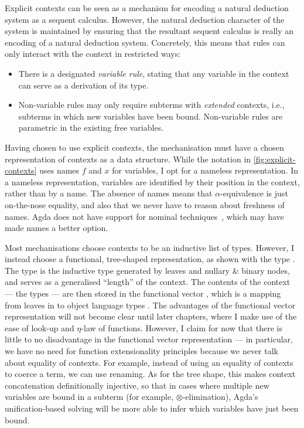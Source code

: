 Explicit contexts can be seen as a mechanism for encoding a natural deduction
system as a sequent calculus.
However, the natural deduction character of the system is maintained by
ensuring that the resultant sequent calculus is really an encoding of a
natural deduction system.
Concretely, this means that rules can only interact with the context in
restricted ways:

\begin{itemize}
  \item There is a designated \emph{variable rule}, stating that any variable
    in the context can serve as a derivation of its type.
  \item Non-variable rules may only require subterms with \emph{extended}
    contexts, i.e., subterms in which new variables have been bound.
    Non-variable rules are parametric in the existing free variables.
\end{itemize}

Having chosen to use explicit contexts, the mechanisation must have a chosen
representation of contexts as a data structure.
While the notation in \cref{fig:explicit-contexts} uses names $f$ and $x$
for variables, I opt for a nameless representation.
In a nameless representation, variables are identified by their position in
the context, rather than by a name.
The absence of names means that $\alpha$-equivalence is just on-the-nose
equality, and also that we never have to reason about freshness of names.
Agda does not have support for nominal techniques~\cite{GP02}, which may have
made names a better option.

Most mechanisations choose contexts to be an inductive list of types.
However, I instead choose a functional, tree-shaped representation, as shown
with the type .
The type  is the inductive type generated by leaves and
nullary \& binary nodes, and serves as a generalised ``length'' of the context.
The contents of the context --- the types --- are then stored in the functional
vector , which is a mapping from leaves in 
to object language types .
The advantages of the functional vector representation will not become clear
until later chapters, where I make use of the ease of
look-up and $\eta$-law of functions.
However, I claim for now that there is little to no disadvantage in the
functional vector representation --- in particular, we have no need for
function extensionality principles because we never talk about equality of
contexts.
For example, instead of using an equality of contexts to coerce a term, we can
use renaming.
As for the tree shape, this makes context concatenation definitionally
injective, so that in cases where multiple new variables are bound in a subterm
(for example, $\otimes$-elimination), Agda's unification-based solving will
be more able to infer which variables have just been bound.

